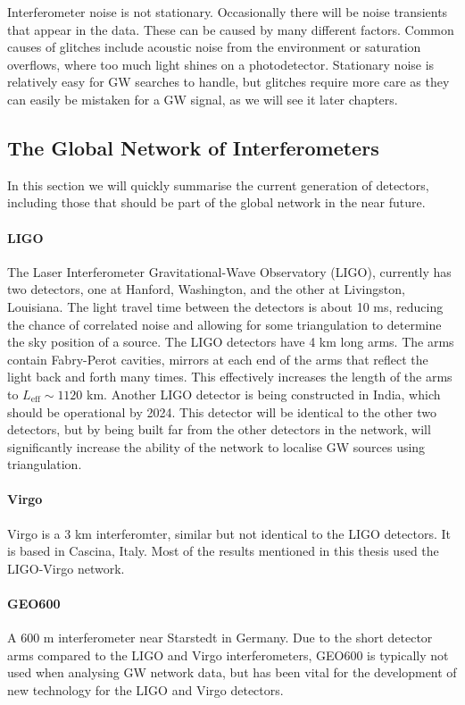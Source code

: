 \documentclass[11pt]{cuthesis}
\begin{document}
Interferometer noise is not stationary. Occasionally there will be noise transients that appear in the data. These can be caused by many different factors. Common causes of glitches include acoustic noise from the environment or saturation overflows, where too much light shines on a photodetector. \cite{detchar} Stationary noise is relatively easy for GW searches to handle, but glitches require more care as they can easily be mistaken for a GW signal, as we will see it later chapters. 


\subsection{The Global Network of Interferometers} \label{sec:gw network}
In this section we will quickly summarise the current generation of detectors, including those that should be part of the global network in the near future.
\paragraph{LIGO}
The Laser Interferometer Gravitational-Wave Observatory (LIGO), currently has two detectors, one at Hanford, Washington, and the other at Livingston, Louisiana. The light travel time between the detectors is about 10 ms, reducing the chance of correlated noise and allowing for some triangulation to determine the sky position of a source. The LIGO detectors have 4 km long arms. The arms contain Fabry-Perot cavities, mirrors at each end of the arms that reflect the light back and forth many times. This effectively increases the length of the arms to $L_\text{eff}\sim1120$ km. Another LIGO detector is being constructed in India, which should be operational by 2024. This detector will be identical to the other two detectors, but by being built far from the other detectors in the network, will significantly increase the ability of the network to localise GW sources using triangulation.

\paragraph{Virgo}
Virgo is a 3 km interferomter, similar but not identical to the LIGO detectors. It is based in Cascina, Italy. Most of the results mentioned in this thesis used the LIGO-Virgo network. 

\paragraph{GEO600}
A 600 m interferometer near Starstedt in Germany. Due to the short detector arms compared to the LIGO and Virgo interferometers, GEO600 is typically not used when analysing GW network data, but has been vital for the development of new technology for the LIGO and Virgo detectors. 
\end{document}
